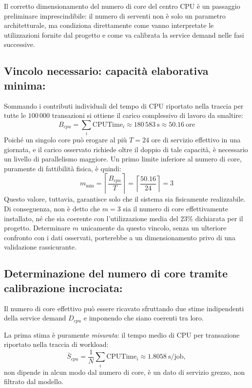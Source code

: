 \documentclass[11pt,a4paper]{article}
\begin{document}
Il corretto dimensionamento del numero di core del centro CPU è un passaggio preliminare
imprescindibile: il numero di serventi non è solo un parametro architetturale, ma condiziona
direttamente come vanno interpretate le utilizzazioni fornite dal progetto e come va calibrata la
service demand nelle fasi successive.

\subsection{Vincolo necessario: capacità elaborativa minima:}

Sommando i contributi individuali del tempo di CPU riportato nella traccia per tutte le
$100\,000$ transazioni si ottiene il carico complessivo di lavoro da smaltire:
\begin{equation}
B_{cpu} = \sum_i \text{CPUTime}_i \approx 180\,583\ \text{s} \approx 50.16\ \text{ore}
\end{equation}
Poiché un singolo core può erogare al più $T=24$ ore di servizio effettivo in una giornata, e il
carico osservato richiede oltre il doppio di tale capacità, è necessario un livello di parallelismo
maggiore. Un primo limite inferiore al numero di core, puramente di fattibilità fisica, è
quindi:
\begin{equation}
m_{\min} = \left\lceil \frac{B_{cpu}}{T} \right\rceil = \left\lceil \frac{50.16}{24} \right\rceil = 3
\end{equation}
Questo valore, tuttavia, garantisce solo che il sistema sia fisicamente realizzabile. Di conseguenza, non è
detto che $m=3$ sia il numero di core effettivamente installato, né che sia coerente con l'utilizzazione media del 23\% dichiarata per il progetto. Determinare $m$ unicamente da questo vincolo, senza un ulteriore confronto con i dati osservati, porterebbe a un dimensionamento privo di una validazione rassicurante.

\subsection{Determinazione del numero di core tramite calibrazione incrociata:}
\label{sec:core-calib}

Il numero di core effettivo può essere ricavato sfruttando due stime indipendenti della service demand $D_{cpu}$ e imponendo che siano coerenti tra loro.

La prima stima è puramente \emph{misurata}: il tempo medio di CPU per transazione riportato
nella traccia di workload:
\begin{equation}
\bar S_{cpu} = \frac{1}{N}\sum_i \text{CPUTime}_i \approx 1.8058\ \text{s/job},
\end{equation}
non dipende in alcun modo dal numero di core, è un dato di servizio grezzo, non filtrato dal
modello.
\end{document}
